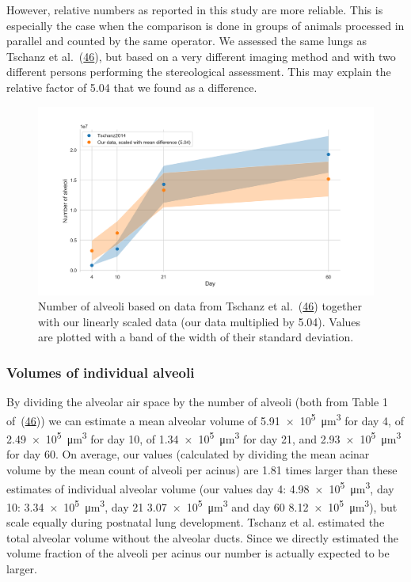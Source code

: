 \documentclass[
  american,
]{article}
\begin{document}
However, relative numbers as reported in this study are more reliable.
This is especially the case when the comparison is done in groups of animals processed in parallel and counted by the same operator.
We assessed the same lungs as Tschanz et al.~(\protect\hyperlink{ref-wnl86DEM}{46}), but based on a very different imaging method and with two different persons performing the stereological assessment.
This may explain the relative factor of 5.04 that we found as a difference.

\begin{figure}
\hypertarget{fig:08}{%
\centering
\includegraphics{images/fig08.png}
\caption{Number of alveoli based on data from Tschanz et al.~(\protect\hyperlink{ref-wnl86DEM}{46}) together with our linearly scaled data (our data multiplied by 5.04).
Values are plotted with a band of the width of their standard deviation.}\label{fig:08}
}
\end{figure}

\hypertarget{volumes-of-individual-alveoli}{%
\subsubsection{Volumes of individual alveoli}\label{volumes-of-individual-alveoli}}

By dividing the alveolar air space by the number of alveoli (both from Table 1 of~(\protect\hyperlink{ref-wnl86DEM}{46})) we can estimate a mean alveolar volume of 5.91~×~10\textsuperscript{5}~μm\textsuperscript{3} for day 4, of 2.49~×~10\textsuperscript{5}~μm\textsuperscript{3} for day 10, of 1.34~×~10\textsuperscript{5}~μm\textsuperscript{3} for day 21, and 2.93~×~10\textsuperscript{5}~μm\textsuperscript{3} for day 60.
On average, our values (calculated by dividing the mean acinar volume by the mean count of alveoli per acinus) are 1.81 times larger than these estimates of individual alveolar volume (our values day 4: 4.98~×~10\textsuperscript{5}~μm\textsuperscript{3}, day 10: 3.34~×~10\textsuperscript{5}~μm\textsuperscript{3}, day 21 3.07~×~10\textsuperscript{5}~μm\textsuperscript{3} and day 60 8.12~×~10\textsuperscript{5}~μm\textsuperscript{3}), but scale equally during postnatal lung development.
Tschanz et al.
estimated the total alveolar volume without the alveolar ducts.
Since we directly estimated the volume fraction of the alveoli per acinus our number is actually expected to be larger.
\end{document}
